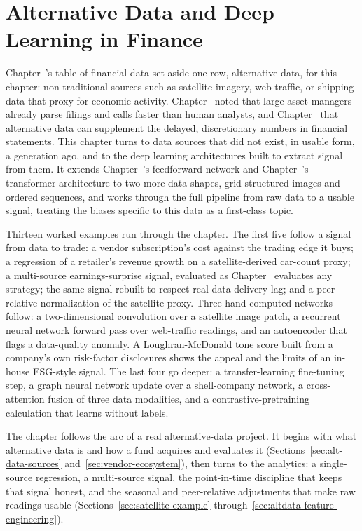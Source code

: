 \documentclass[../ai_in_finance]{subfiles}
\begin{document}
\chapter{Alternative Data and Deep Learning in Finance}

Chapter~'s table of financial data set aside one row, alternative data, for this chapter: non-traditional sources such as satellite imagery, web traffic, or shipping data that proxy for economic activity. Chapter~ noted that large asset managers already parse filings and calls faster than human analysts, and Chapter~ that alternative data can supplement the delayed, discretionary numbers in financial statements. This chapter turns to data sources that did not exist, in usable form, a generation ago, and to the deep learning architectures built to extract signal from them. It extends Chapter~'s feedforward network and Chapter~'s transformer architecture to two more data shapes, grid-structured images and ordered sequences, and works through the full pipeline from raw data to a usable signal, treating the biases specific to this data as a first-class topic.

Thirteen worked examples run through the chapter. The first five follow a signal from data to trade: a vendor subscription's cost against the trading edge it buys; a regression of a retailer's revenue growth on a satellite-derived car-count proxy; a multi-source earnings-surprise signal, evaluated as Chapter~ evaluates any strategy; the same signal rebuilt to respect real data-delivery lag; and a peer-relative normalization of the satellite proxy. Three hand-computed networks follow: a two-dimensional convolution over a satellite image patch, a recurrent neural network forward pass over web-traffic readings, and an autoencoder that flags a data-quality anomaly. A Loughran-McDonald tone score built from a company's own risk-factor disclosures shows the appeal and the limits of an in-house ESG-style signal. The last four go deeper: a transfer-learning fine-tuning step, a graph neural network update over a shell-company network, a cross-attention fusion of three data modalities, and a contrastive-pretraining calculation that learns without labels.

The chapter follows the arc of a real alternative-data project. It begins with what alternative data is and how a fund acquires and evaluates it (Sections~\ref{sec:alt-data-sources} and~\ref{sec:vendor-ecosystem}), then turns to the analytics: a single-source regression, a multi-source signal, the point-in-time discipline that keeps that signal honest, and the seasonal and peer-relative adjustments that make raw readings usable (Sections~\ref{sec:satellite-example} through~\ref{sec:altdata-feature-engineering}).
\end{document}
